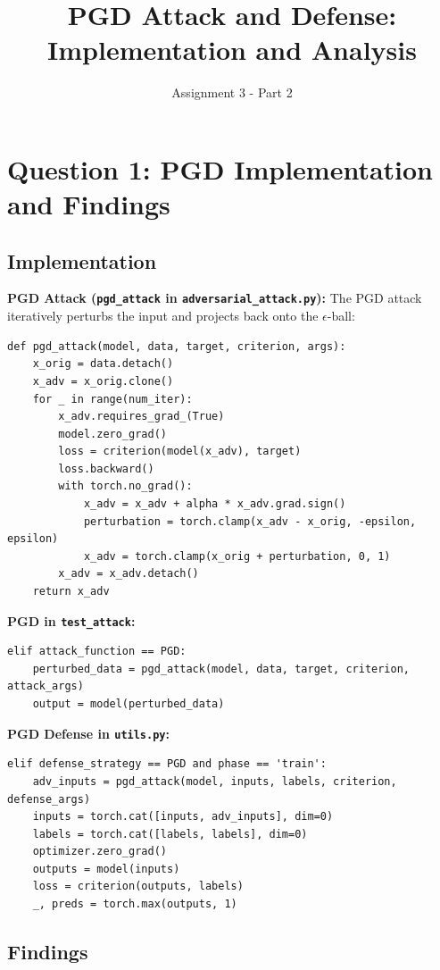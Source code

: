 \documentclass[11pt]{article}
\title{PGD Attack and Defense: Implementation and Analysis}
\author{Assignment 3 - Part 2}
\date{}
\begin{document}
\maketitle

\section{Question 1: PGD Implementation and Findings}

\subsection{Implementation}

\textbf{PGD Attack (\texttt{pgd\_attack} in \texttt{adversarial\_attack.py}):}
The PGD attack iteratively perturbs the input and projects back onto the $\epsilon$-ball:
\begin{verbatim}
def pgd_attack(model, data, target, criterion, args):
    x_orig = data.detach()
    x_adv = x_orig.clone()
    for _ in range(num_iter):
        x_adv.requires_grad_(True)
        model.zero_grad()
        loss = criterion(model(x_adv), target)
        loss.backward()
        with torch.no_grad():
            x_adv = x_adv + alpha * x_adv.grad.sign()
            perturbation = torch.clamp(x_adv - x_orig, -epsilon, epsilon)
            x_adv = torch.clamp(x_orig + perturbation, 0, 1)
        x_adv = x_adv.detach()
    return x_adv
\end{verbatim}

\textbf{PGD in \texttt{test\_attack}:}
\begin{verbatim}
elif attack_function == PGD:
    perturbed_data = pgd_attack(model, data, target, criterion, attack_args)
    output = model(perturbed_data)
\end{verbatim}

\textbf{PGD Defense in \texttt{utils.py}:}
\begin{verbatim}
elif defense_strategy == PGD and phase == 'train':
    adv_inputs = pgd_attack(model, inputs, labels, criterion, defense_args)
    inputs = torch.cat([inputs, adv_inputs], dim=0)
    labels = torch.cat([labels, labels], dim=0)
    optimizer.zero_grad()
    outputs = model(inputs)
    loss = criterion(outputs, labels)
    _, preds = torch.max(outputs, 1)
\end{verbatim}

\subsection{Findings}
\end{document}
